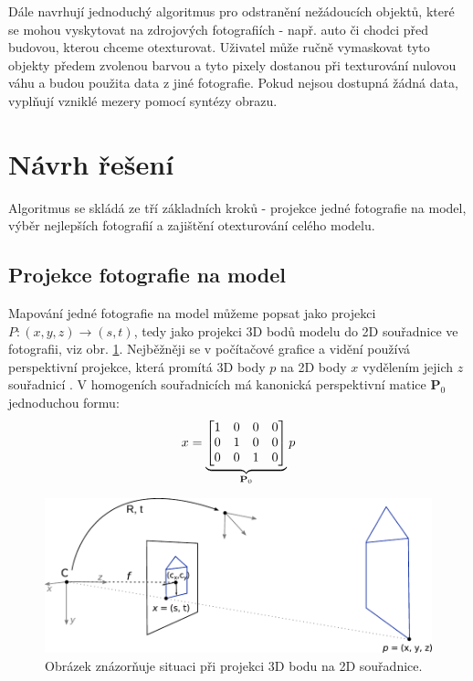 \documentclass[11pt,twoside,a4paper]{book}
\begin{document}
Dále navrhují jednoduchý algoritmus pro odstranění nežádoucích objektů, které se mohou vyskytovat na zdrojových fotografiích - např. auto či chodci před budovou, kterou chceme otexturovat. Uživatel může ručně vymaskovat tyto objekty předem zvolenou barvou a tyto pixely dostanou při texturování nulovou váhu a budou použita data z jiné fotografie. Pokud nejsou dostupná žádná data, vyplňují vzniklé mezery pomocí syntézy obrazu.

\section{Návrh řešení}

Algoritmus se skládá ze tří základních kroků - projekce jedné fotografie na model, výběr nejlepších fotografií a zajištění otexturování celého modelu.

\subsection{Projekce fotografie na model}
\label{sec:matice-kamery}

Mapování jedné fotografie na model můžeme popsat jako projekci $P: (x, y, z) \to (s, t)$, tedy jako projekci 3D bodů modelu do 2D souřadnice ve fotografii, viz obr. \ref{fig:camera-projection}. Nejběžněji se v počítačové grafice a vidění používá perspektivní projekce, která promítá 3D body $p$ na 2D body $x$ vydělením jejich $z$ souřadnicí \cite{Szeliski}. V homogeních souřadnicích má kanonická perspektivní matice \textbf{P}$_0$ jednoduchou formu:
\begin{align}
\label{eq:persp-projection}
x = 
\underbrace{
\begin{bmatrix}
1 & 0 & 0 & 0 \\
0 & 1 & 0 & 0 \\
0 & 0 & 1 & 0 \\
\end{bmatrix}}_\text{\textbf{P}$_0$}
p
\end{align}
\noindent

\begin{figure}[t]
\begin{center}
\includegraphics[width=\textwidth]{figures/camera-projection}
\caption{Obrázek znázorňuje situaci při projekci 3D bodu na 2D souřadnice.}
\label{fig:camera-projection}
\end{center}
\end{figure}
\end{document}
